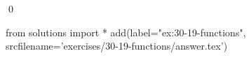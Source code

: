 
\begin{ex}
  \label{ex:30-19-functions}
  
  \qed
\end{ex}
\begin{python0}
from solutions import *
add(label="ex:30-19-functions",
    srcfilename='exercises/30-19-functions/answer.tex')
\end{python0}

